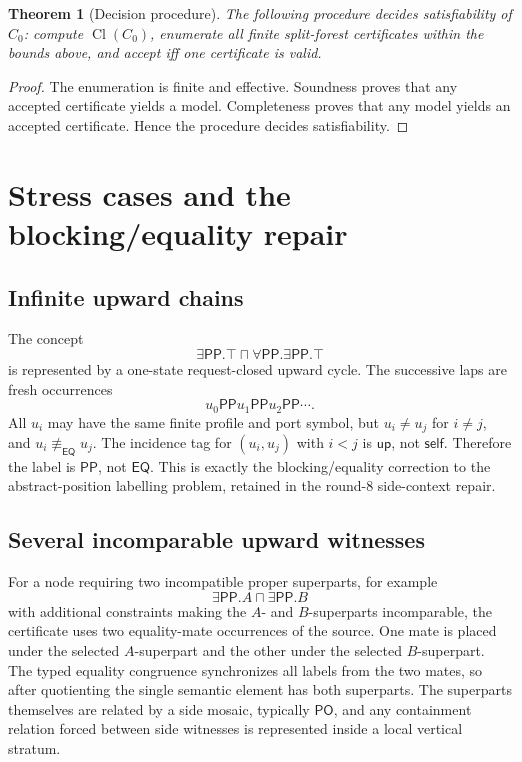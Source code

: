 \documentclass[11pt]{article}
\newtheorem{theorem}{Theorem}[section]
\newcommand{\Cl}{\operatorname{Cl}}
\newcommand{\EQ}{\mathsf{EQ}}
\newcommand{\PP}{\mathsf{PP}}
\newcommand{\PO}{\mathsf{PO}}
\newcommand{\eqc}{\equiv_{\EQ}}
\newcommand{\self}{\mathsf{self}}
\newcommand{\up}{\mathsf{up}}
\begin{document}
\begin{theorem}[Decision procedure]
The following procedure decides satisfiability of \(C_0\): compute \(\Cl(C_0)\), enumerate all finite split-forest certificates within the bounds above, and accept iff one certificate is valid.
\end{theorem}

\begin{proof}
The enumeration is finite and effective.  Soundness proves that any accepted certificate yields a model.  Completeness proves that any model yields an accepted certificate.  Hence the procedure decides satisfiability.
\end{proof}

\section{Stress cases and the blocking/equality repair}

\subsection{Infinite upward chains}
The concept
\[
  \exists\PP.\top\sqcap\forall\PP.\exists\PP.\top
\]
is represented by a one-state request-closed upward cycle.  The successive laps are fresh occurrences
\[
  u_0\PP u_1\PP u_2\PP\cdots.
\]
All \(u_i\) may have the same finite profile and port symbol, but \(u_i\ne u_j\) for \(i\ne j\), and \(u_i\not\eqc u_j\).  The incidence tag for \((u_i,u_j)\) with \(i<j\) is \(\up\), not \(\self\).  Therefore the label is \(\PP\), not \(\EQ\).  This is exactly the blocking/equality correction to the abstract-position labelling problem, retained in the round-8 side-context repair.

\subsection{Several incomparable upward witnesses}
For a node requiring two incompatible proper superparts, for example
\[
\exists\PP.A\sqcap\exists\PP.B
\]
with additional constraints making the \(A\)- and \(B\)-superparts incomparable, the certificate uses two equality-mate occurrences of the source.  One mate is placed under the selected \(A\)-superpart and the other under the selected \(B\)-superpart.  The typed equality congruence synchronizes all labels from the two mates, so after quotienting the single semantic element has both superparts.  The superparts themselves are related by a side mosaic, typically \(\PO\), and any containment relation forced between side witnesses is represented inside a local vertical stratum.
\end{document}

